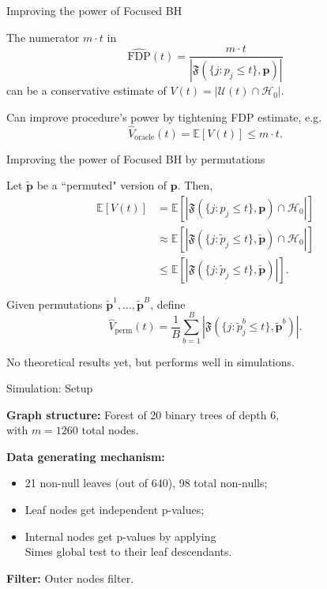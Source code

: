 \documentclass{beamer}
\begin{document}
\begin{frame}{Improving the power of Focused BH}

The numerator $m \cdot t$ in
$$\widehat{\text{FDP}}(t) = \frac{m \cdot t}{|\mathfrak F(\{j: p_j \leq t\}, \bm p)|}$$
can be a conservative estimate of $V(t) = |\mathcal U(t) \cap \mathcal H_0|$.
\vspace{0.1in}

Can improve procedure's power by tightening FDP estimate, e.g.
\begin{equation*}
\widehat V_{\text{oracle}}(t) = \mathbb E[V(t)] \leq m \cdot t.
\end{equation*}


\end{frame}


\begin{frame}{Improving the power of Focused BH by permutations}
	
	Let $\widetilde{\bm p}$ be a ``permuted" version of $\bm p$. Then,
	\begin{equation*}
	\begin{split}
	\mathbb E[V(t)] &= \mathbb E\left[|\mathfrak{F}(\{j: p_j \leq t\}, \bm p) \cap \mathcal H_0|\right] \\
	&\approx \mathbb E[|\mathfrak{F}(\{j: \widetilde p_j \leq t\}, \widetilde{\bm p}) \cap \mathcal H_0|] \\
	&\leq \mathbb E[|\mathfrak{F}(\{j: \widetilde p_j \leq t\}, \widetilde{\bm p})|].
	\end{split}
	\end{equation*}
	
	Given permutations $\widetilde{\bm p}^1, \dots, \widetilde{\bm p}^B$, define
	\begin{equation*}
	\widehat V_{\text{perm}}(t) = \frac{1}{B}\sum_{b = 1}^B |\mathfrak{F}(\{j: \widetilde{p}^b_j \leq t\}, \widetilde{\bm p}^b)|.
	\end{equation*}
	
	No theoretical results yet, but performs well in simulations.	
\end{frame}

\begin{frame}{Simulation: Setup}

\textbf{Graph structure:} Forest of 20 binary trees of depth 6, \\ with $m = 1260$ total nodes.
\vspace{0.1in}

\textbf{Data generating mechanism:}
\begin{itemize}
	\item 21 non-null leaves (out of 640), 98 total non-nulls;
	\item Leaf nodes get independent p-values;
	\item Internal nodes get p-values by applying \\ Simes global test to their leaf descendants.
\end{itemize}
\vspace{0.075in}

\textbf{Filter:} Outer nodes filter.

\end{frame}
\end{document}

